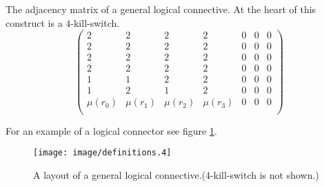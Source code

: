 The adjacency matrix of a general logical connective. At the heart of
this construct is a $4$-kill-switch. 
\[
	\left(
	\begin{array}{ccccccc}
		2 & 2 & 2 & 2 & 0 & 0 & 0 \\
		2 & 2 & 2 & 2 & 0 & 0 & 0 \\
		2 & 2 & 2 & 2 & 0 & 0 & 0 \\
		2 & 2 & 2 & 2 & 0 & 0 & 0 \\
		1 & 1 & 2 & 2 & 0 & 0 & 0 \\
		1 & 2 & 1 & 2 & 0 & 0 & 0 \\
		\mu(r_{0}) & \mu(r_{1}) & \mu(r_{2}) & \mu(r_{3}) & 0 & 0 & 0 \\
	\end{array}
	\right)
\]

For an example of a logical connector see figure
\ref{figure:connective}. 
\begin{figure}
	\begin{center}
		\texttt{[image: image/definitions.4]}
	\end{center}
	\caption{A layout of a general logical connective.($4$-kill-switch is not shown.)}\label{figure:connective}
\end{figure}



